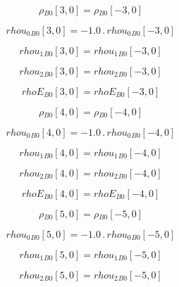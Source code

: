 \documentclass{article}
\begin{document}
\begin{dmath}{\rho{_{B0}}}[{3,0}] = {\rho{_{B0}}}[{-3,0}]\end{dmath}

\begin{dmath}{rhou_{0}{_{B0}}}[{3,0}] = - 1.0 \,.\, {rhou_{0}{_{B0}}}[{-3,0}]\end{dmath}

\begin{dmath}{rhou_{1}{_{B0}}}[{3,0}] = {rhou_{1}{_{B0}}}[{-3,0}]\end{dmath}

\begin{dmath}{rhou_{2}{_{B0}}}[{3,0}] = {rhou_{2}{_{B0}}}[{-3,0}]\end{dmath}

\begin{dmath}{rhoE{_{B0}}}[{3,0}] = {rhoE{_{B0}}}[{-3,0}]\end{dmath}

\begin{dmath}{\rho{_{B0}}}[{4,0}] = {\rho{_{B0}}}[{-4,0}]\end{dmath}

\begin{dmath}{rhou_{0}{_{B0}}}[{4,0}] = - 1.0 \,.\, {rhou_{0}{_{B0}}}[{-4,0}]\end{dmath}

\begin{dmath}{rhou_{1}{_{B0}}}[{4,0}] = {rhou_{1}{_{B0}}}[{-4,0}]\end{dmath}

\begin{dmath}{rhou_{2}{_{B0}}}[{4,0}] = {rhou_{2}{_{B0}}}[{-4,0}]\end{dmath}

\begin{dmath}{rhoE{_{B0}}}[{4,0}] = {rhoE{_{B0}}}[{-4,0}]\end{dmath}

\begin{dmath}{\rho{_{B0}}}[{5,0}] = {\rho{_{B0}}}[{-5,0}]\end{dmath}

\begin{dmath}{rhou_{0}{_{B0}}}[{5,0}] = - 1.0 \,.\, {rhou_{0}{_{B0}}}[{-5,0}]\end{dmath}

\begin{dmath}{rhou_{1}{_{B0}}}[{5,0}] = {rhou_{1}{_{B0}}}[{-5,0}]\end{dmath}

\begin{dmath}{rhou_{2}{_{B0}}}[{5,0}] = {rhou_{2}{_{B0}}}[{-5,0}]\end{dmath}
\end{document}
